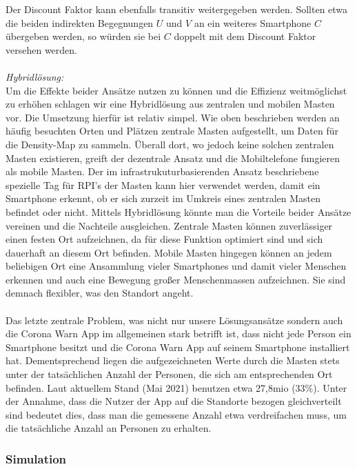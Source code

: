 \documentclass[conference]{IEEEtran}
\begin{document}
Der Discount Faktor kann ebenfalls transitiv weitergegeben werden. 
Sollten etwa die beiden indirekten Begegnungen $U$ und $V$ an ein weiteres Smartphone $C$ übergeben werden, so würden sie bei $C$ doppelt mit dem Discount Faktor versehen werden.\\
\\
\textit{Hybridlösung:}\\
Um die Effekte beider Ansätze nutzen zu können und die Effizienz weitmöglichst zu erhöhen schlagen wir eine Hybridlösung aus zentralen und mobilen Masten vor. 
Die Umsetzung hierfür ist relativ simpel. Wie oben beschrieben werden an häufig besuchten Orten und Plätzen zentrale Masten aufgestellt, um Daten für die Density-Map zu sammeln. 
Überall dort, wo jedoch keine solchen zentralen Masten existieren, greift der dezentrale Ansatz und die Mobiltelefone fungieren als mobile Masten. 
Der im infrastrukuturbasierenden Ansatz beschriebene spezielle Tag für RPI's der Masten kann hier verwendet werden, damit ein Smartphone erkennt, ob er sich zurzeit im Umkreis eines zentralen Masten befindet oder nicht. 
Mittels Hybridlösung könnte man die Vorteile beider Ansätze vereinen und die Nachteile ausgleichen. Zentrale Masten können zuverlässiger einen festen Ort aufzeichnen, da für diese Funktion optimiert sind und sich dauerhaft an diesem Ort befinden.
Mobile Masten hingegen können an jedem beliebigen Ort eine Ansammlung vieler Smartphones und damit vieler Menschen erkennen und auch eine Bewegung großer Menschenmassen aufzeichnen.
Sie sind demnach flexibler, was den Standort angeht.\\
\\
Das letzte zentrale Problem, was nicht nur unsere Lösungsansätze sondern auch die Corona Warn App im allgemeinen stark betrifft ist, dass nicht jede Person ein Smartphone besitzt und die  Corona Warn App auf seinem Smartphone installiert hat. 
Dementsprechend liegen die aufgezeichneten Werte durch die Masten stets unter der tatsächlichen Anzahl der Personen, die sich am entsprechenden Ort befinden. Laut aktuellem Stand (Mai 2021) benutzen etwa 27,8mio (33\%). \cite{Downloads}
Unter der Annahme, dass die Nutzer der App auf die Standorte bezogen gleichverteilt sind bedeutet dies, dass man die gemessene Anzahl etwa verdreifachen muss, um die tatsächliche Anzahl an Personen zu erhalten.\\

\subsubsection{Simulation}
\end{document}
